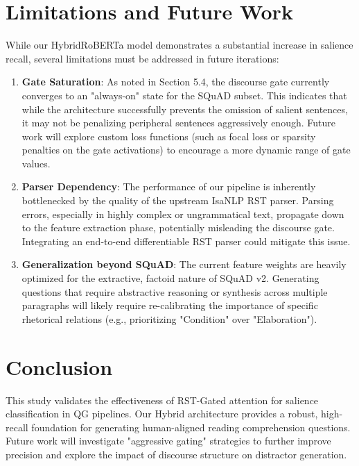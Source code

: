 \documentclass[11pt,a4paper]{article}
\begin{document}
\section{Limitations and Future Work}
While our HybridRoBERTa model demonstrates a substantial increase in salience recall, several limitations must be addressed in future iterations:
\begin{enumerate}
    \item \textbf{Gate Saturation}: As noted in Section 5.4, the discourse gate currently converges to an "always-on" state for the SQuAD subset. This indicates that while the architecture successfully prevents the omission of salient sentences, it may not be penalizing peripheral sentences aggressively enough. Future work will explore custom loss functions (such as focal loss or sparsity penalties on the gate activations) to encourage a more dynamic range of gate values.
    \item \textbf{Parser Dependency}: The performance of our pipeline is inherently bottlenecked by the quality of the upstream IsaNLP RST parser. Parsing errors, especially in highly complex or ungrammatical text, propagate down to the feature extraction phase, potentially misleading the discourse gate. Integrating an end-to-end differentiable RST parser could mitigate this issue.
    \item \textbf{Generalization beyond SQuAD}: The current feature weights are heavily optimized for the extractive, factoid nature of SQuAD v2. Generating questions that require abstractive reasoning or synthesis across multiple paragraphs will likely require re-calibrating the importance of specific rhetorical relations (e.g., prioritizing "Condition" over "Elaboration").
\end{enumerate}

\section{Conclusion}
This study validates the effectiveness of RST-Gated attention for salience classification in QG pipelines. Our Hybrid architecture provides a robust, high-recall foundation for generating human-aligned reading comprehension questions. Future work will investigate "aggressive gating" strategies to further improve precision and explore the impact of discourse structure on distractor generation.
\end{document}
